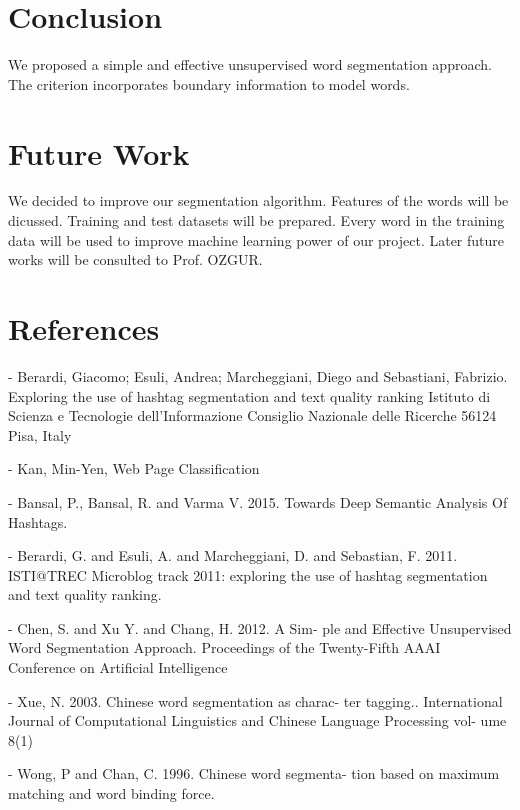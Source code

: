 \documentclass[12pt]{comjnl}
\begin{document}
\section{Conclusion}
We proposed a simple and effective unsupervised
word segmentation approach. The criterion incorporates
boundary information to model words.

\section{Future Work}
We decided to improve our segmentation algorithm. Features of the words will be dicussed. Training and test
datasets will be prepared. Every word in the training data will be used to improve machine
learning power of our project. Later future works will be consulted to Prof. OZGUR.

\section{References}
- Berardi, Giacomo; Esuli, Andrea; Marcheggiani, Diego and Sebastiani, Fabrizio. Exploring the use of hashtag segmentation and text quality ranking 
Istituto di Scienza e Tecnologie dell’Informazione Consiglio Nazionale delle Ricerche 56124 Pisa, Italy

- Kan, Min-Yen, Web Page Classification

- Bansal, P., Bansal, R. and Varma V. 2015. Towards
Deep Semantic Analysis Of Hashtags.

- Berardi, G. and Esuli, A. and Marcheggiani, D. and
Sebastian, F. 2011. ISTI@TREC Microblog track
2011: exploring the use of hashtag segmentation
and text quality ranking.

- Chen, S. and Xu Y. and Chang, H. 2012. A Sim-
ple and Effective Unsupervised Word Segmentation
Approach. Proceedings of the Twenty-Fifth AAAI
Conference on Artificial Intelligence

- Xue, N. 2003. Chinese word segmentation as charac-
ter tagging.. International Journal of Computational
Linguistics and Chinese Language Processing vol-
ume 8(1)

- Wong, P and Chan, C. 1996. Chinese word segmenta-
tion based on maximum matching and word binding
force.
\nocite{*}



\end{document}
